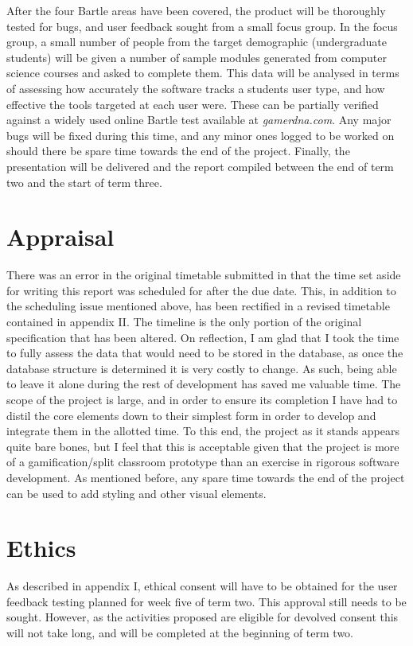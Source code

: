 \documentclass[10pt,a4paper]{report}
\begin{document}
After the four Bartle areas have been covered, the product will be thoroughly tested for bugs, and user feedback sought from a small focus group. In the focus group, a small number of people from the target demographic (undergraduate students) will be given a number of sample modules generated from computer science courses and asked to complete them. This data will be analysed in terms of assessing how accurately the software tracks a students user type, and how effective the tools targeted at each user were. These can be partially verified against a widely used online Bartle test available at \textit{gamerdna.com}. Any major bugs will be fixed during this time, and any minor ones logged to be worked on should there be spare time towards the end of the project. Finally, the presentation will be delivered and the report compiled between the end of term two and the start of term three.

\section*{Appraisal}
There was an error in the original timetable submitted in that the time set aside for writing this report was scheduled for after the due date. This, in addition to the scheduling issue mentioned above, has been rectified in a revised timetable contained in appendix II. The timeline is the only portion of the original specification that has been altered. On reflection, I am glad that I took the time to fully assess the data that would need to be stored in the database, as once the database structure is determined it is very costly to change. As such, being able to leave it alone during the rest of development has saved me valuable time. The scope of the project is large, and in order to ensure its completion I have had to distil the core elements down to their simplest form in order to develop and integrate them in the allotted time. To this end, the project as it stands appears quite bare bones, but I feel that this is acceptable given that the project is more of a gamification/split classroom prototype than an exercise in rigorous software development. As mentioned before, any spare time towards the end of the project can be used to add styling and other visual elements.

\section*{Ethics}
As described in appendix I, ethical consent will have to be obtained for the user feedback testing planned for week five of term two. This approval still needs to be sought. However, as the activities proposed are eligible for devolved consent this will not take long, and will be completed at the beginning of term two.
\end{document}
